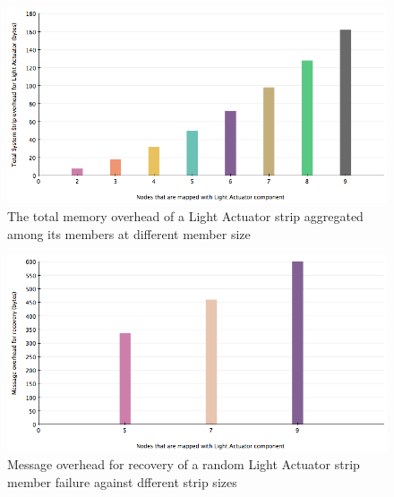 
\begin{figure}[h!]
\centering
    \includegraphics[width=\linewidth]{figures/results-system-overhead-vs-network-size}
\caption{The total memory overhead of a Light Actuator strip aggregated among its members at different member size}
\label{fig:results-system-overhead-vs-network-size}
\end{figure}


\begin{figure}[h!]
\centering
    \includegraphics[width=\linewidth]{figures/results-message-overhead-vs-strip-size}
\caption{Message overhead for recovery of a random Light Actuator strip member failure against dfferent strip sizes}
\label{fig:results-message-overhead-vs-strip-size}
\end{figure}

